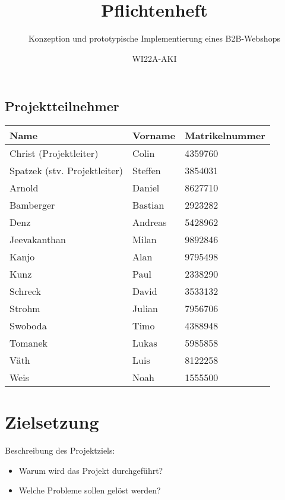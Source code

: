 \documentclass[%
	ngerman,
	12pt,
	a4paper,
	oneside
]{scrbook}
\title{Pflichtenheft}
\subtitle{Konzeption und prototypische Implementierung eines B2B-Webshops}
\author{WI22A-AKI}
\begin{document}
\maketitle

\section{Projektteilnehmer}
\begin{tabular}{l|l|l}
	\textbf{Name}                & \textbf{Vorname} & \textbf{Matrikelnummer} \\ \hline
	Christ (Projektleiter)       & Colin            & 4359760                 \\
	Spatzek (stv. Projektleiter) & Steffen          & 3854031                 \\ \hline
	Arnold                       & Daniel           & 8627710                 \\
	Bamberger                    & Bastian          & 2923282                 \\
	Denz                         & Andreas          & 5428962                 \\
	Jeevakanthan                 & Milan            & 9892846                 \\
	Kanjo                        & Alan             & 9795498                 \\
	Kunz                         & Paul             & 2338290                 \\
	Schreck                      & David            & 3533132                 \\
	Strohm                       & Julian           & 7956706                 \\
	Swoboda                      & Timo             & 4388948                 \\
	Tomanek                      & Lukas            & 5985858                 \\
	Väth                         & Luis             & 8122258                 \\
	Weis                         & Noah             & 1555500
\end{tabular}

\tableofcontents

\chapter{Zielsetzung}
Beschreibung des Projektziels:
\begin{itemize}
	\item Warum wird das Projekt durchgeführt?
	\item Welche Probleme sollen gelöst werden?
\end{itemize}
\end{document}
